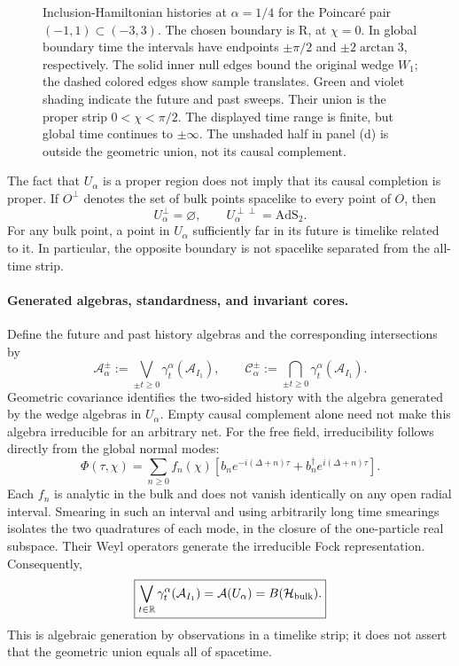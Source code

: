 \documentclass[a4paper,11pt]{article}
\theoremstyle{definition}
\begin{document}
\begin{figure}[tp]
 \caption{Inclusion-Hamiltonian histories at $\alpha=1/4$ for the
 Poincar\'e pair $(-1,1)\subset(-3,3)$. The chosen boundary is R,
 at $\chi=0$. In global boundary time the intervals have endpoints
 $\pm\pi/2$ and $\pm2\arctan3$, respectively. The solid inner null
 edges bound the original wedge $W_1$; the dashed colored edges show
 sample translates. Green and violet shading indicate the future and
 past sweeps. Their union is the proper strip $0<\chi<\pi/2$.
 The displayed time range is finite, but global time continues to
 $\pm\infty$. The unshaded half in panel (d) is outside the geometric
 union, not its causal complement.}
 \label{fig:ads2-inclusion-histories}
\end{figure}

The fact that $U_\alpha$ is a proper region does not imply that its
causal completion is proper. If $O^\perp$ denotes the set of bulk
points spacelike to every point of $O$, then
\begin{equation}
 U_\alpha^\perp=\varnothing,
 \qquad
 U_\alpha^{\perp\perp}=\mathrm{AdS}_2.
 \label{eq:ads2-history-causal-completion}
\end{equation}
For any bulk point, a point in $U_\alpha$ sufficiently far in its
future is timelike related to it. In particular, the opposite boundary
is not spacelike separated from the all-time strip.

\paragraph{Generated algebras, standardness, and invariant cores.}
Define the future and past history algebras and the corresponding
intersections by
\begin{equation}
 \mathcal A_\alpha^\pm
 :=\bigvee_{\pm t\ge0}\gamma_t^\alpha(\mathcal A_{I_1}),
 \qquad
 \mathcal C_\alpha^\pm
 :=\bigcap_{\pm t\ge0}\gamma_t^\alpha(\mathcal A_{I_1}).
 \label{eq:ads2-history-algebras}
\end{equation}
Geometric covariance identifies the two-sided history with the algebra
generated by the wedge algebras in $U_\alpha$. Empty causal complement
alone need not make this algebra irreducible for an arbitrary net.
For the free field, irreducibility follows directly from the global
normal modes:
\begin{equation}
 \Phi(\tau,\chi)
 =\sum_{n\ge0}f_n(\chi)
 \left[b_n e^{-i(\Delta+n)\tau}
       +b_n^\dagger e^{i(\Delta+n)\tau}\right].
 \label{eq:ads2-history-modes}
\end{equation}
Each $f_n$ is analytic in the bulk and does not vanish identically on
any open radial interval. Smearing in such an interval and using
arbitrarily long time smearings isolates the two quadratures of each
mode, in the closure of the one-particle real subspace. Their Weyl
operators generate the irreducible Fock representation. Consequently,
\begin{equation}
 \boxed{
 \bigvee_{t\in\mathbb R}\gamma_t^\alpha(\mathcal A_{I_1})
 =\mathcal A(U_\alpha)=B(\mathcal H_{\rm bulk}).
 }
 \label{eq:ads2-history-full-generation}
\end{equation}
This is algebraic generation by observations in a timelike strip;
it does not assert that the geometric union equals all of spacetime.
\end{document}
